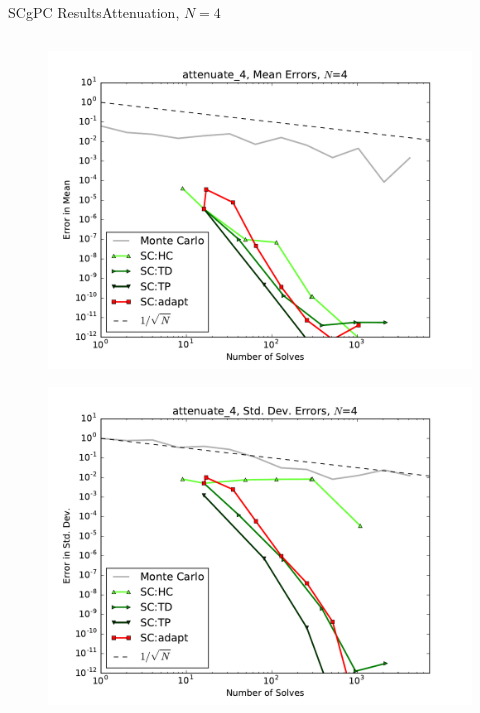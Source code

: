 \documentclass{beamer}
\begin{document}
\begin{frame}{SCgPC Results}{Attenuation, $N=4$}
\begin{columns}
\begin{column}{0.5\textwidth}
\begin{figure}[h!]
          \includegraphics[width=0.8\linewidth]{anlmodels/attenuate_4_mean_errs_nohdmr}
        \end{figure}
        \vspace{-20pt}
        \begin{figure}[h!]
          \centering
          \includegraphics[width=0.8\linewidth]{anlmodels/attenuate_4_variance_errs_nohdmr}
        \end{figure}
   \end{column}
 \end{columns}
\end{frame}
\end{document}
